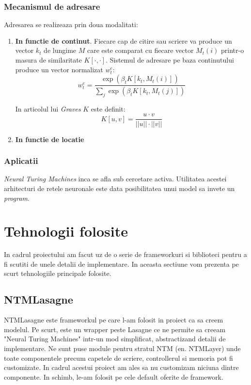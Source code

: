 \documentclass[12pt]{article}
\begin{document}
\subsubsection{Mecanismul de adresare}

Adresarea se realizeaza prin doua modalitati:
\begin{enumerate}
	\item \textbf{In functie de continut}. Fiecare cap de citire sau scriere va produce un vector $k_t$ de lungime $M$ care este comparat cu fiecare vector $M_t(i)$ printr-o masura de similaritate $K[\cdot, \cdot]$. Sistemul de adresare pe baza continutului produce un vector normalizat $w_{t}^e$:
	$$ w_{t}^e = \frac{\exp{(\beta_tK[k_t, M_t(i)])}}{\sum_j \exp{(\beta_tK[k_t, M_t(j)])}}$$
	
	In articolul lui \textit{Graves} $K$ este definit:
	$$ K[u, v] = \frac{u \cdot v}{||u|| \cdot ||v||} $$
	
	\item \textbf{In functie de locatie}
\end{enumerate}


\subsubsection{Aplicatii}

\textit{Neural Turing Machines} inca se afla sub cercetare activa. Utilitatea acestei arhitecturi de retele neuronale este data posibilitatea unui model sa invete un \textit{program}. 

\section{Tehnologii folosite}

In cadrul proiectului am facut uz de o serie de frameworkuri si biblioteci pentru a fi scutiti de unele detalii de implementare. In aceasta sectiune vom prezenta pe scurt tehnologiile principale folosite.

\subsection{NTMLasagne}

NTMLasagne este frameworkul pe care l-am folosit in proiect ca sa creem modelul. Pe scurt, este un wrapper peste Lasagne  ce ne permite sa creeam "Neural Turing Machines" intr-un mod simplificat, abstractizand detalii de implementare. Ne sunt puse module pentru stratul NTM (en. NTMLayer) unde toate componentele precum capetele de scriere, controllerul si memoria pot fi customizate. In cadrul acestui proiect am ales sa nu customizam niciuna dintre componente. In schimb, le-am folosit pe cele default oferite de framework.
\end{document}
